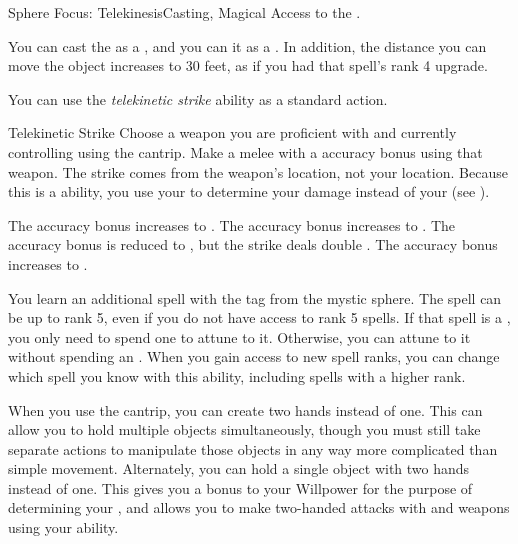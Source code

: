     \begin{magicalfeat}{Sphere Focus: Telekinesis}{Casting, Magical}
        \featpre Access to the  .

         You can cast the   as a , and you can  it as a .
        In addition, the distance you can move the object increases to 30 feet, as if you had that spell's rank 4 upgrade.

         You can use the \textit{telekinetic strike} ability as a standard action.
        \begin{magicalactiveability}{Telekinetic Strike}
            \rankline
            Choose a weapon you are proficient with and currently controlling using the  cantrip.
            Make a melee  with a  accuracy bonus using that weapon.
            The strike comes from the weapon's location, not your location.
            Because this is a \magical ability, you use your  to determine your damage instead of your  (see ).

            \rankline
             The accuracy bonus increases to .
             The accuracy bonus increases to .
             The accuracy bonus is reduced to , but the strike deals double .
             The accuracy bonus increases to .
        \end{magicalactiveability}

         You learn an additional spell with the  tag from the  mystic sphere.
        The spell can be up to rank 5, even if you do not have access to rank 5 spells.
        If that spell is a , you only need to spend one  to attune to it.
        Otherwise, you can attune to it without spending an .
        When you gain access to new spell ranks, you can change which spell you know with this ability, including spells with a higher rank.

         When you use the  cantrip, you can create two hands instead of one.
        This can allow you to hold multiple objects simultaneously, though you must still take separate actions to manipulate those objects in any way more complicated than simple movement.
        Alternately, you can hold a single object with two hands instead of one.
        This gives you a  bonus to your Willpower for the purpose of determining your , and allows you to make two-handed attacks with  and  weapons using your  ability.
    \end{magicalfeat}

